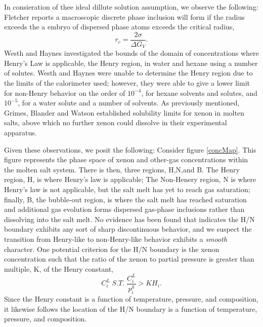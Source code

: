 In consieration of thee ideal dillute solution assumption, we observe the following: Fletcher reports a macroscopic discrete phase inclusion will form if the radius exceeds the a embryo of dispersed phase atoms exceeds the critical radius,
\begin{equation}
    r_c = \frac{2\sigma}{\Delta G_V}.
\end{equation}\cite{Fletcher1958}
Westh and Haynes investigated the bounds of the domain of concentrations where Henry's Law is applicable,  the Henry region, in water and hexane using a number of solutes. \cite{Westh1998} Westh and Haynes were unable to determine the Henry region due to the limits of the calorimeter used; however, they were able to give a lower limit for non-Henry behavior on the order of $10^{-4}$, for hexane solvents and solutes, and $10^{-5}$, for a water solute and a number of solvents.   As previously mentioned, Grimes, Blander and Watson established solubility limits for xenon in molten salts, above which no further xenon could dissolve in their experimental apparatus. \cite{Grimes1958,Blander1959,Watson1962}

Given these observations, we posit the following: Consider figure \ref{concMap}.  This figure represents the phase space of xenon and other-gas concentrations within the molten salt system.  There is then, three regions, H,N,and B.  The Henry region, H, is where Henry's law is applicable; The Non-Henery region, N is where Henry's law is not applicable, but the salt melt has yet to reach gas saturation; finally, B, the bubble-out region, is where the salt melt has reached saturation and additional gas evolution forms dispersed gas-phase inclusions rather than dissolving into the salt melt.  No evidence has been found that indicates the H/N boundary exhibits any sort of sharp discontinuous behavior, and we suspect the transition from Henry-like to non-Henry-like behavior exhibits a \textit{smooth} character.  One potential criterion for the H/N boundary is the xenon concentration such that the ratio of the xenon to partial pressure is greater than multiple, K, of the Henry constant,
\begin{equation}
    C_i^L \; S.T. \; \frac{C_i^L}{p_i^g} > KH_i.
\end{equation}
Since the Henry constant is a function of temperature, pressure, and composition, it likewise follows the location of the  H/N boundary is a function of temperature, pressure, and composition. 
